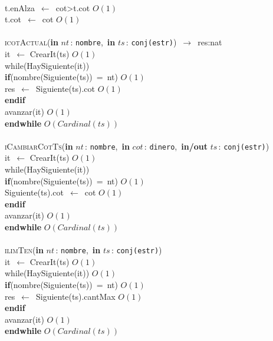 \documentclass[10pt, a4paper]{article}
\let\NombreFuncion=\textsc
\let\TipoVariable=\texttt
\let\ModificadorArgumento=\textbf
\newcommand{\tab}{\hspace*{7mm}}
\newcommand{\In}[2]{\ModificadorArgumento{in} \ensuremath{#1}\,: \TipoVariable{#2}\xspace}
\newcommand{\Inout}[2]{\ModificadorArgumento{in/out} \ensuremath{#1}\,: \TipoVariable{#2}\xspace}
\begin{document}
\\
\tab t.enAlza\ $\leftarrow$\ cot>t.cot \hfill $O(1)$
\\
\tab t.cot\ $\leftarrow$\ cot \hfill $O(1)$
\\ \\
  \NombreFuncion{icotActual}(\In{nt}{nombre},\ \In{ts}{conj(estr)})\ $\rightarrow$\ res:nat
\\
\tab it\ $\leftarrow$ CrearIt(ts) \hfill $O(1)$
\\
\tab while(HaySiguiente(it)) 
\\
\tab \tab \textbf{if}(nombre(Siguiente(ts))\ =\ nt) \hfill $O(1)$
\\
\tab \tab \tab res\ $\leftarrow$\ Siguiente(ts).cot \hfill $O(1)$
\\
\tab \tab \textbf{endif}
\\
\tab \tab avanzar(it) \hfill $O(1)$
\\
\tab \textbf{endwhile} \hfill $O(Cardinal(ts))$
\\ \\
  \NombreFuncion{iCambiarCotTs}(\In{nt}{nombre},\ \In{cot}{dinero},\ \Inout{ts}{conj(estr)})
\\
\tab it\ $\leftarrow$ CrearIt(ts) \hfill $O(1)$
\\
\tab while(HaySiguiente(it)) 
\\
\tab \tab \textbf{if}(nombre(Siguiente(ts))\ =\ nt) \hfill $O(1)$
\\
\tab \tab \tab Siguiente(ts).cot\ $\leftarrow$\ cot \hfill $O(1)$
\\
\tab \tab \textbf{endif}
\\
\tab \tab avanzar(it) \hfill $O(1)$
\\
\tab \textbf{endwhile} \hfill $O(Cardinal(ts))$
\\ \\
  \NombreFuncion{ilimTen}(\In{nt}{nombre},\ \In{ts}{conj(estr)})
\\
\tab it\ $\leftarrow$ CrearIt(ts) \hfill $O(1)$
\\
\tab while(HaySiguiente(it)) \hfill $O(1)$
\\
\tab \tab \textbf{if}(nombre(Siguiente(ts))\ =\ nt) \hfill $O(1)$
\\
\tab \tab \tab res\ $\leftarrow$\ Siguiente(ts).cantMax \hfill $O(1)$
\\
\tab \tab \textbf{endif}
\\
\tab \tab avanzar(it) \hfill $O(1)$
\\
\tab \textbf{endwhile} \hfill $O(Cardinal(ts))$
\\ \\
\end{document}
